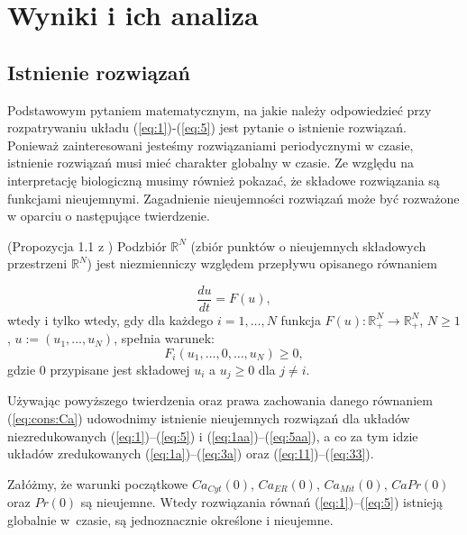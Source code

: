 \chapter{Wyniki i ich analiza}
\label{chap:wyniki}


\section{Istnienie rozwiązań}

Podstawowym pytaniem matematycznym, na jakie należy odpowiedzieć przy rozpatrywaniu układu (\ref{eq:1})-(\ref{eq:5}) jest pytanie o istnienie rozwiązań. Ponieważ zainteresowani jesteśmy rozwiązaniami periodycznymi w czasie, istnienie rozwiązań musi mieć charakter globalny w czasie. Ze względu na interpretację biologiczną musimy również pokazać, że składowe rozwiązania są funkcjami nieujemnymi. Zagadnienie nieujemności rozwiązań może być rozważone w oparciu o następujące twierdzenie. 

\medskip 

\begin{thm} \label{th:chepyzov} 

(Propozycja 1.1 z \cite{Chepyzhov2002}) Podzbiór $\mathbb{R}^N$ (zbiór punktów o nieujemnych składowych przestrzeni $\mathbb{R}^N$) jest niezmienniczy względem przepływu opisanego równaniem

\[
\frac{du}{dt} = F(u), 
\]
 wtedy i tylko wtedy, gdy dla każdego  \mbox{$i=1,\ldots,N$} funkcja 
$F(u):\mathbb{R}^N_+ \to \mathbb{R}^N_+$, $N \ge 1$, $u:=(u_1,\ldots,u_N)$, spełnia warunek:  
\begin{equation} \label{warch} 
F_i(u_1,\ldots,0,\ldots,u_N) \geq 0,
\end{equation} 
\noindent gdzie $0$ przypisane jest składowej $u_i$ a $u_j \geq 0$ dla $j \neq i$.
\end{thm}

\noindent Używając powyższego twierdzenia oraz prawa zachowania danego równaniem (\ref{eq:cons:Ca}) udowodnimy istnienie nieujemnych rozwiązań dla układów niezredukowanych (\ref{eq:1})--(\ref{eq:5}) i (\ref{eq:1aa})--(\ref{eq:5aa}), a co za tym idzie układów zredukowanych (\ref{eq:1a})--(\ref{eq:3a}) oraz (\ref{eq:11})--(\ref{eq:33}). 

\begin{thm} \label{ist1}
Załóżmy, że warunki początkowe $Ca_{Cyt}(0)$, $Ca_{ER}(0)$, $Ca_{Mit}(0)$, $CaPr(0)$ oraz $Pr(0)$ są nieujemne. Wtedy rozwiązania równań (\ref{eq:1})--(\ref{eq:5}) istnieją globalnie w~czasie, są jednoznacznie określone i nieujemne. 
\end{thm}

